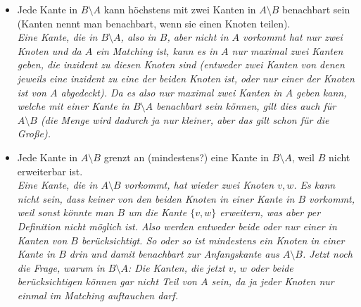 \documentclass[paper=a4,10pt]{scrartcl}
\begin{document}
\begin{itemize}
\item Jede Kante in $B \setminus A$ kann höchstens mit zwei Kanten in $A \setminus B$ benachbart sein (Kanten nennt man benachbart, wenn sie einen Knoten teilen). \\
\textit{Eine Kante, die in $B \setminus A$, also in $B$, aber nicht in $A$ vorkommt hat nur zwei Knoten und da $A$ ein Matching ist, kann es in $A$ nur maximal zwei Kanten geben, die inzident zu diesen Knoten sind (entweder zwei Kanten von denen jeweils eine inzident zu eine der beiden Knoten ist, oder nur einer der Knoten ist von $A$ abgedeckt). Da es also nur maximal zwei Kanten in $A$ geben kann, welche mit einer Kante in $B \setminus A$ benachbart sein können, gilt dies auch für $A \setminus B$ (die Menge wird dadurch ja nur kleiner, aber das gilt schon für die Große).}

\item Jede Kante in $A \setminus B$ grenzt an (mindestens?) eine Kante in $B \setminus A$, weil $B$ nicht erweiterbar ist.\\
\textit{Eine Kante, die in $A \setminus B$ vorkommt, hat wieder zwei Knoten $v, w$. Es kann nicht sein, dass keiner von den beiden Knoten in einer Kante in $B$ vorkommt, weil sonst könnte man $B$ um die Kante $\{v, w\}$ erweitern, was aber per Definition nicht möglich ist. Also werden entweder beide oder nur einer in Kanten von $B$ berücksichtigt. So oder so ist mindestens ein Knoten in einer Kante in $B$ drin und damit benachbart zur Anfangskante aus $A \setminus B$. Jetzt noch die Frage, warum in $B\setminus A$: Die Kanten, die jetzt $v$, $w$ oder beide berücksichtigen können gar nicht Teil von $A$ sein, da ja jeder Knoten nur einmal im Matching auftauchen darf.}
\end{itemize}
\end{document}
